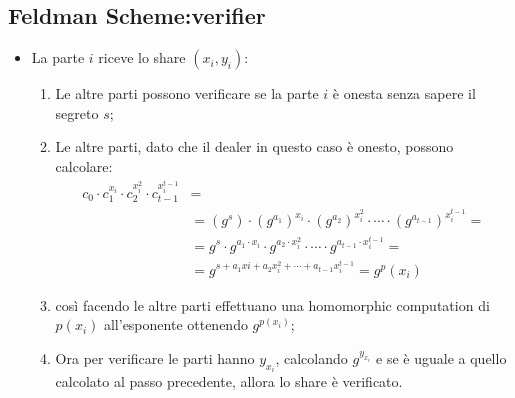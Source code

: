 \documentclass{book}
\begin{document}
\subsection{Feldman Scheme:verifier}
\begin{itemize}
    \item La parte \(i\) riceve lo share \((x_{i},y_{i})\):\begin{enumerate}
              \item Le altre parti possono verificare se la parte \(i\) è onesta senza sapere il segreto \(s\);
              \item Le altre parti, dato che il dealer in questo caso è onesto, possono calcolare:\begin{align*}
                        c_{0}\cdot c_{1}^{x_i}\cdot c_{2}^{x_{i}^{2}}\cdot c_{t-1}^{x_{i}^{t-1}} & =                                                                                                           \\                                                       & =(g^{s})\cdot {(g^{a_{1}})}^{x_{i}}\cdot {(g^{a_{2}})}^{x_{i}^2}\cdot\cdots\cdot {(g^{a_{t-1}})}^{x_{i}^{t-1}}= \\
                                                                                                 & = g^{s}\cdot g^{a_{1}\cdot x_{i}}\cdot g^{a_{2}\cdot x_{i}^2}\cdot\cdots\cdot g^{a_{t-1}\cdot x_{i}^{t-1}}= \\
                                                                                                 & = g^{s+a_{1}x{i}+a_{2}x_{i}^2+\cdots +a_{t-1}x_{i}^{t-1}}=g^p(x_{i})
                    \end{align*}
              \item così facendo le altre parti effettuano una homomorphic computation di \(p(x_{i})\) all'esponente ottenendo \(g^{p(x_{i})}\);
              \item Ora per verificare le parti hanno \(y_{x_{i}}\), calcolando \(g^{y_{x_{i}}}\) e se è uguale a quello calcolato al passo precedente, allora lo share è verificato\@.
          \end{enumerate}
\end{itemize}
\end{document}

